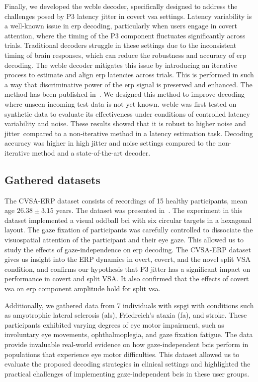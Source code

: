 Finally, we developed the \acf{wcble} decoder, specifically designed to address
the challenges posed by P3 latency jitter in covert \ac{vsa} settings.
Latency variability is a well-known issue in \ac{erp} decoding, particularly
when users engage in covert attention, where the timing of the P3 component
fluctuates significantly across trials.
Traditional decoders struggle in these settings due to the inconsistent timing
of brain responses, which can reduce the robustness and accuracy of
\ac{erp} decoding.
The \ac{wcble} decoder mitigates this issue by introducing an iterative process
to estimate and align \ac{erp} latencies across trials.
This is performed in such a way that discriminative power of the \ac{erp}
signal is preserved and enhanced.
The method has been published in~\textcite{VanDenKerchove2024}.
We designed this method to improve decoding where
unseen incoming test data is not yet known.
\Ac{wcble} was first tested on synthetic data to evaluate its
effectiveness under conditions of controlled latency variability and noise.
These results showed that it is robust to higher noise and jitter\ compared to
a non-iterative method in a latency estimation task.
Decoding accuracy was higher in high jitter and noise
settings compared to the non-iterative method and a state-of-the-art
decoder.

\subsection{Gathered datasets}
The CVSA-ERP dataset consists of recordings of 15 healthy participants, mean age
$26.38\pm3.15$ years.
The dataset was presented in~\textcite{VanDenKerchove2024}.
The experiment in this dataset implemented a visual oddball \ac{bci} with six
circular targets in a hexagonal layout.
The gaze fixation of participants was carefully controlled to dissociate the
visuospatial attention of the participant and their eye gaze.
This allowed us to study the effects of gaze-independence on \ac{erp} decoding.
The CVSA-ERP dataset gives us insight into the ERP dynamics in overt, covert, and the
novel split VSA condition, and confirms our hypothesis that P3 jitter has a
significant impact on performance in covert and split VSA.
It also confirmed that the effects of covert \ac{vsa} on \ac{erp} component
amplitude hold for split \ac{vsa}.

Additionally, we gathered data from 7 individuals with \ac{sspgi} with conditions such as
amyotrophic lateral sclerosis (\ac{als}), Friedreich's ataxia (\ac{fa}), and stroke.
These participants exhibited varying degrees of eye motor impairment, such as
involuntary eye movements, ophthalmoplegia, and gaze fixation fatigue.
The data provide invaluable real-world evidence on how gaze-independent
\acp{bci} perform in populations that experience eye motor difficulties.
This dataset allowed us to evaluate the proposed decoding strategies in clinical settings and
highlighted the practical challenges of implementing gaze-independent \acp{bci} in these user
groups.

